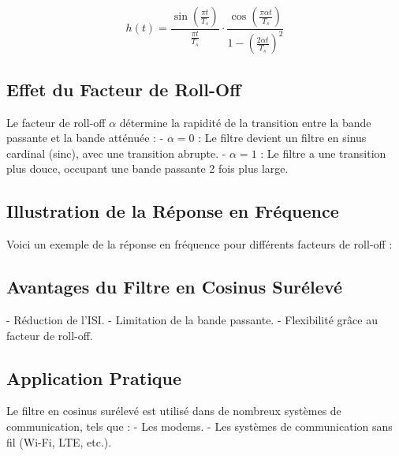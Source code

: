 \documentclass[10pt,a4paper]{article}
\begin{document}
\[
h(t) = \frac{\sin\left(\frac{\pi t}{T_s}\right)}{\frac{\pi t}{T_s}} \cdot \frac{\cos\left(\frac{\pi \alpha t}{T_s}\right)}{1 - \left(\frac{2 \alpha t}{T_s}\right)^2}
\]

\subsection*{Effet du Facteur de Roll-Off}
Le facteur de roll-off \( \alpha \) détermine la rapidité de la transition entre la bande passante et la bande atténuée :
- \( \alpha = 0 \) : Le filtre devient un filtre en sinus cardinal (sinc), avec une transition abrupte.
- \( \alpha = 1 \) : Le filtre a une transition plus douce, occupant une bande passante 2 fois plus large.

\subsection*{Illustration de la Réponse en Fréquence}
Voici un exemple de la réponse en fréquence pour différents facteurs de roll-off :


\subsection*{Avantages du Filtre en Cosinus Surélevé}
- Réduction de l'ISI.
- Limitation de la bande passante.
- Flexibilité grâce au facteur de roll-off.

\subsection*{Application Pratique}
Le filtre en cosinus surélevé est utilisé dans de nombreux systèmes de communication, tels que :
- Les modems.
- Les systèmes de communication sans fil (Wi-Fi, LTE, etc.).
\end{document}
